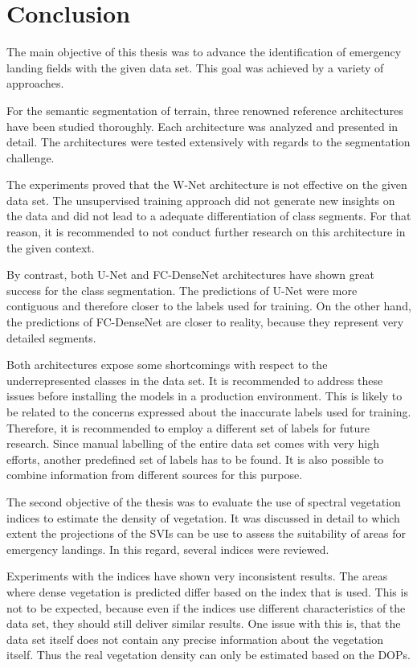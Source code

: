 \section{Conclusion}
The main objective of this thesis was to advance the identification of emergency landing fields with the given data set. This goal was achieved by a variety of approaches.

For the semantic segmentation of terrain, three renowned reference architectures have been studied thoroughly. Each architecture was analyzed and presented in detail. The architectures were tested extensively with regards to the segmentation challenge. 

The experiments proved that the W-Net architecture is not effective on the given data set. The unsupervised training approach did not generate new insights on the data and did not lead to a adequate differentiation of class segments. For that reason, it is recommended to not conduct further research on this architecture in the given context.

By contrast, both U-Net and FC-DenseNet architectures have shown great success for the class segmentation. The predictions of U-Net were more contiguous and therefore closer to the labels used for training. On the other hand, the predictions of FC-DenseNet are closer to reality, because they represent very detailed segments. 

Both architectures expose some shortcomings with respect to the underrepresented classes in the data set. It is recommended to address these issues before installing the models in a production environment. This is likely to be related to the concerns expressed about the inaccurate labels used for training. Therefore, it is recommended to employ a different set of labels for future research. Since manual labelling of the entire data set comes with very high efforts, another predefined set of labels has to be found. It is also possible to combine information from different sources for  this purpose.  

The second objective of the thesis was to evaluate the use of spectral vegetation indices to estimate the density of vegetation. It was discussed in detail to which extent the projections of the SVIs can be use to assess the suitability of areas for emergency landings. In this regard, several indices were reviewed.

Experiments with the indices have shown very inconsistent results. The areas where dense vegetation is predicted differ based on the index that is used. This is not to be expected, because even if the indices use different characteristics of the data set, they should still deliver similar results. One issue with this is, that the data set itself does not contain any precise information about the vegetation itself. Thus the real vegetation density can only be estimated based on the DOPs.

